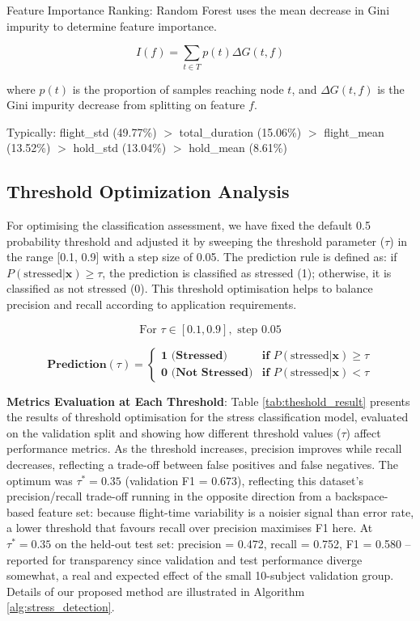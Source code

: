 \documentclass[fleqn,10pt]{wlscirep}
\begin{document}
Feature Importance Ranking: Random Forest uses the mean decrease in Gini impurity to determine feature importance.

\begin{equation}
I(f) = \sum_{t \in T} p(t) \Delta G(t, f)
\end{equation}

where $p(t)$ is the proportion of samples reaching node $t$, and $\Delta G(t, f)$ is the Gini impurity decrease from splitting on feature $f$.

Typically: flight\_std (49.77\%) $>$ total\_duration (15.06\%) $>$ flight\_mean (13.52\%) $>$ hold\_std (13.04\%) $>$ hold\_mean (8.61\%)

\subsection*{Threshold Optimization Analysis}
For optimising the classification assessment, we have fixed the default 0.5 probability threshold and adjusted it by sweeping the threshold parameter (\(\tau\)) in the range [0.1, 0.9] with a step size of 0.05. The prediction rule is defined as: if \( P(\text{stressed}|\boldsymbol{x}) \geq \tau \), the prediction is classified as stressed (1); otherwise, it is classified as not stressed (0). This threshold optimisation helps to balance precision and recall according to application requirements.

\begin{equation}
\text{For } \tau \in [0.1, 0.9], \text{ step } 0.05
\end{equation}

\begin{equation}
\textbf{Prediction}(\tau) = \begin{cases}
\textbf{1 (Stressed)} & \textbf{if } P(\text{stressed}|\boldsymbol{x}) \geq \tau \\
\textbf{0 (Not Stressed)} & \textbf{if } P(\text{stressed}|\boldsymbol{x}) < \tau
\end{cases}
\end{equation}

\textbf{Metrics Evaluation at Each Threshold}:
Table \ref{tab:theshold_result} presents the results of threshold optimisation for the stress classification model, evaluated on the validation split and showing how different threshold values (\(\tau\)) affect performance metrics. As the threshold increases, precision improves while recall decreases, reflecting a trade-off between false positives and false negatives. The optimum was $\tau^* = 0.35$ (validation F1 = 0.673), reflecting this dataset's precision/recall trade-off running in the opposite direction from a backspace-based feature set: because flight-time variability is a noisier signal than error rate, a lower threshold that favours recall over precision maximises F1 here. At $\tau^* = 0.35$ on the held-out test set: precision = 0.472, recall = 0.752, F1 = 0.580 -- reported for transparency since validation and test performance diverge somewhat, a real and expected effect of the small 10-subject validation group. Details of our proposed method are illustrated in Algorithm \ref{alg:stress_detection}.
\end{document}
